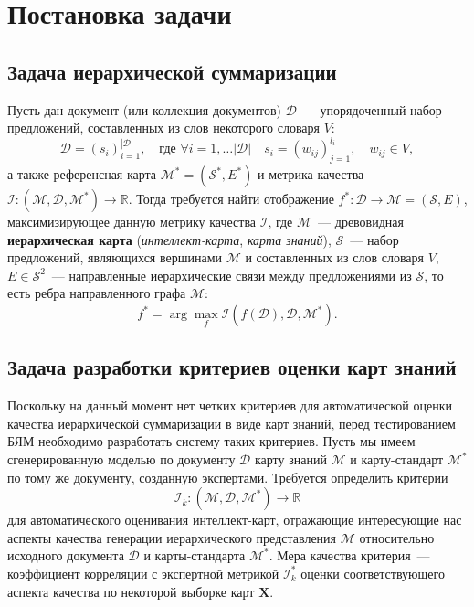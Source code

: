 \documentclass[12pt]{article}
\newcommand{\X}{\mathbf{X}}
\newcommand{\D}{\mathcal{D}}
\newcommand{\M}{\mathcal{M}}
\newcommand{\I}{\mathcal{I}}
\renewcommand{\S}{\mathcal{S}}
\newcommand{\R}{\mathbb{R}}
\begin{document}
\newpage
\section{Постановка задачи}
\subsection{Задача иерархической суммаризации}
Пусть дан документ (или коллекция документов) $\D$~--- упорядоченный набор предложений, составленных из слов некоторого словаря $V$: 
$$
\D = \left(s_i\right)_{i=1}^{|\D|},\quad \text{где } \forall i=1,\dots |\D|\quad s_i = \left(w_{ij}\right)_{j=1}^{l_i}, \quad w_{ij}\in V,
$$
а также референсная карта $\M^* = (\S^*, E^*)$ и метрика качества $\I: (\M, \D, \M^*) \rightarrow \R$. Тогда требуется найти отображение $f^*: \D \rightarrow \M = (\S, E)$, максимизирующее данную метрику качества $\I$, где $\M$~--- древовидная \textbf{иерархическая карта} (\textit{интеллект-карта}, \textit{карта знаний}), $\S$~--- набор предложений, являющихся вершинами $\M$ и составленных из слов словаря $V$, $E\in \S^2$~--- направленные иерархические связи между предложениями из $\S$, то есть ребра направленного графа $\M$:
$$
f^* = \arg\max\limits_{f} \I(f(\D), \D, \M^*).
$$

\subsection{Задача разработки критериев оценки карт знаний}
Поскольку на данный момент нет четких критериев для автоматической оценки качества иерархической суммаризации в виде карт знаний, перед тестированием БЯМ необходимо разработать систему таких критериев. Пусть мы имеем сгенерированную моделью по документу $\D$ карту знаний $\M$ и карту-стандарт $\M^*$ по тому же документу, созданную экспертами. 
Требуется определить критерии $$\I_k: (\M, \D, \M^*) \rightarrow \R$$ для автоматического оценивания интеллект-карт, отражающие интересующие нас аспекты качества генерации иерархического представления $\M$ относительно исходного документа $\D$ и карты-стандарта $\M^*$. 
Мера качества критерия~--- коэффициент корреляции с экспертной метрикой $\I^*_k$ оценки соответствующего аспекта качества по некоторой выборке карт $\X$. 
\end{document}
